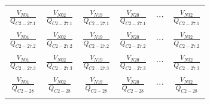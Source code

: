 \begin{enumerate}[\bfseries 5.1]
\begin{table}[H]
{\begin{tabular}{cccccc}
				&&&&&\\
				$\frac{V_{N01}}{Q_{C 2-27.1}}$& $\frac{V_{N02}}{Q_{C 2-27.1}}$& $\frac{V_{N19}}{Q_{C 2-27.1}}$& $\frac{V_{N20}}{Q_{C 2-27.1}}$&$ \cdots $&$\frac{V_{N32}}{Q_{C 2-27.1}}$\\
				&&&&&\\
				$\frac{V_{N01}}{Q_{C 2-27.2}}$& $\frac{V_{N02}}{Q_{C 2-27.2}}$& $\frac{V_{N19}}{Q_{C 2-27.2}}$& $\frac{V_{N20}}{Q_{C 2-27.2}}$&$ \cdots $&$\frac{V_{N32}}{Q_{C 2-27.2}}$\\
				&&&&&\\				
				$\frac{V_{N01}}{Q_{C 2-27.3}}$& $\frac{V_{N02}}{Q_{C 2-27.3}}$& $\frac{V_{N19}}{Q_{C 2-27.3}}$& $\frac{V_{N20}}{Q_{C 2-27.3}}$&$ \cdots$&$\frac{V_{N32}}{Q_{C 2-27.3}}$\\
				&&&&&\\
				$\frac{V_{N01}}{Q_{C 2-28}}$& $\frac{V_{N02}}{Q_{C 2-28}}$& $\frac{V_{N19}}{Q_{C 2-28}}$& $\frac{V_{N20}}{Q_{C 2-28}}$&$\cdots$&$\frac{V_{N32}}{Q_{C 2-28}}$\\
				&&&&&\\

\end{tabular}}
\end{table}
\end{enumerate}
